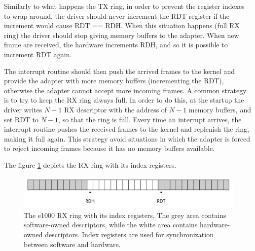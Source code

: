 Similarly to what happens the TX ring, in order to prevent the register indexes to wrap around, the driver should never increment the RDT
register if the increment would cause RDT == RDH. When this situation happens (full RX ring) the driver should stop giving memory buffers to
the adapter. When new frame are received, the hardware increments RDH, and so it is possible to increment RDT again.

\vspace{0.5cm}

The interrupt routine should then push the arrived frames to the kernel and provide the adapter with more memory buffers (incrementing
the RDT), otherwise the adapter cannot accept more incoming frames.
A common strategy is to try to keep the RX ring always full. In order to do this, at the startup
the driver writes $N-1$ RX descriptor with the address of $N-1$ memory buffers, and set RDT to $N-1$, so that the ring is full.
Every time an interrupt arrives, the interrupt routine pushes the received frames to the kernel and replenish the ring, making it full again.
This strategy avoid situations in which the adapter is forced to reject incoming frames because it has no memory buffers available.

The figure \ref{fig:rxring} depicts the RX ring with its index registers.

\begin{figure}[bt]
\centering
\includegraphics[scale = 0.35]{rx-ring.pdf}
\caption{The e1000 RX ring with its index registers. The grey area contains software-owned descriptors, while the white area
	contains hardware-owned descriptors. Index registers are used for synchronization between software and hardware.}
\label{fig:rxring}
\end{figure}


